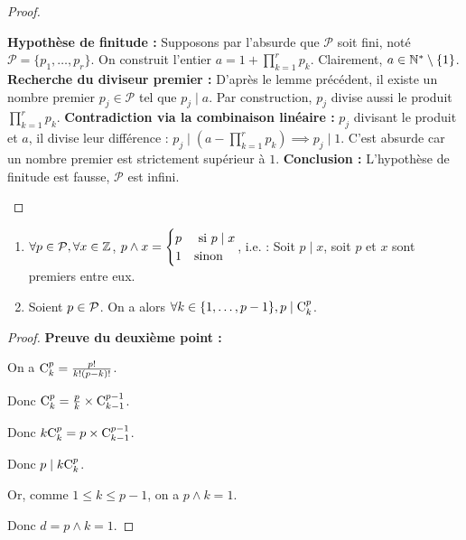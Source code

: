 \documentclass[12pt, a4paper]{report}
\begin{document}
\begin{proof}
    \begin{outline}
        \1 \textbf{Hypothèse de finitude :} 
            \2 Supposons par l'absurde que $\mathcal{P}$ soit fini, noté $\mathcal{P} = \{p_1, \dots, p_r\}$.
            \2 On construit l'entier $a = 1 + \prod_{k=1}^{r} p_k$. Clairement, $a \in \mathbb{N}^* \setminus \{1\}$.
        \1 \textbf{Recherche du diviseur premier :} 
            \2 D'après le lemme précédent, il existe un nombre premier $p_j \in \mathcal{P}$ tel que $p_j \mid a$.
            \2 Par construction, $p_j$ divise aussi le produit $\prod_{k=1}^{r} p_k$.
        \1 \textbf{Contradiction via la combinaison linéaire :} 
            \2 $p_j$ divisant le produit et $a$, il divise leur différence : $p_j \mid \left(a - \prod_{k=1}^{r} p_k\right) \implies p_j \mid 1$.
            \2 C'est absurde car un nombre premier est strictement supérieur à $1$.
        \1 \textbf{Conclusion :} L'hypothèse de finitude est fausse, $\mathcal{P}$ est infini.
    \end{outline}
\end{proof}

\begin{remark}
    \begin{enumerate}
        \item $\forall p \in \mathcal{P}, \forall x \in\mathbb{Z}$, $p\wedge x = \begin{cases}
            p & \text{ si } p \mid x\\
            1 & \text{sinon}
        \end{cases}$, i.e. : Soit $p\mid x$, soit $p$ et $x$ sont premiers entre eux.
        \item Soient $p \in \mathcal{P}$. On a alors $\forall k \in \{1,\dots,p-1\}, p \mid \mathrm{C}_{k}^{p}$.
    \end{enumerate}
\end{remark}

\begin{proof}
    \textbf{Preuve du deuxième point :}

    On a $\mathrm{C}_{k}^{p} = \frac{p!}{k!(p-k)!}$.

    Donc $\mathrm{C}_{k}^{p} = \frac pk \times \mathrm{C}_{k-1}^{p-1}$.

    Donc $k\mathrm{C}_{k}^{p} = p \times \mathrm{C}_{k-1}^{p-1}$.

    Donc $p \mid k \mathrm{C}_{k}^{p}$.

    Or, comme $1 \le k \le p-1$, on a $p \wedge k = 1$.

    Donc $d = p \wedge k = 1$.
\end{proof}
\end{document}

